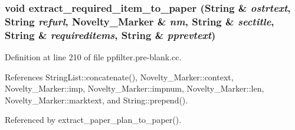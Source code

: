 \subsubsection{\setlength{\rightskip}{0pt plus 5cm}void extract\_\-required\_\-item\_\-to\_\-paper ({\bf String} \& {\em ostrtext}, {\bf String} {\em refurl}, {\bf Novelty\_\-Marker} \& {\em nm}, {\bf String} \& {\em sectitle}, {\bf String} \& {\em requireditems}, {\bf String} \& {\em pprevtext})}\label{ppfilter_8pre-blank_8cc_a4}




Definition at line 210 of file ppfilter.pre-blank.cc.

References String\-List::concatenate(), Novelty\_\-Marker::context, Novelty\_\-Marker::imp, Novelty\_\-Marker::impnum, Novelty\_\-Marker::len, Novelty\_\-Marker::marktext, and String::prepend().

Referenced by extract\_\-paper\_\-plan\_\-to\_\-paper().



